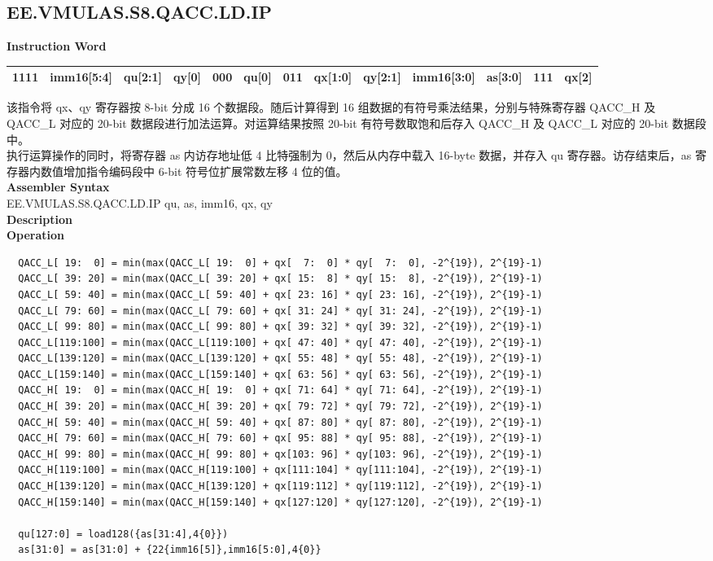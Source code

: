 \subsection{EE.VMULAS.S8.QACC.LD.IP}\label{instruction:EEVMULASS8QACCLDIP}
\setlength\tabcolsep{6pt}
\textbf{Instruction Word} \\
\begin{tabular}{|c|c|c|c|c|c|c|c|c|c|c|c|c|}
	\hline
	1111 & imm16[5:4] & qu[2:1] & qy[0] & 000 & qu[0] & 011 & qx[1:0] & qy[2:1] & imm16[3:0] & as[3:0] & 111 & qx[2] \\
	\hline
\end{tabular}
该指令将 qx、qy 寄存器按 8-bit 分成 16 个数据段。随后计算得到 16 组数据的有符号乘法结果，分别与特殊寄存器 QACC\_H 及 QACC\_L 对应的 20-bit 数据段进行加法运算。对运算结果按照 20-bit 有符号数取饱和后存入 QACC\_H 及 QACC\_L 对应的 20-bit 数据段中。\\
执行运算操作的同时，将寄存器 as 内访存地址低 4 比特强制为 0，然后从内存中载入 16-byte 数据，并存入 qu 寄存器。访存结束后，as 寄存器内数值增加指令编码段中 6-bit 符号位扩展常数左移 4 位的值。\\
\textbf{Assembler Syntax} \\
EE.VMULAS.S8.QACC.LD.IP qu, as, imm16, qx, qy \\
\textbf{Description} \\
\textbf{Operation}
\begin{lstlisting}
  QACC_L[ 19:  0] = min(max(QACC_L[ 19:  0] + qx[  7:  0] * qy[  7:  0], -2^{19}), 2^{19}-1)
  QACC_L[ 39: 20] = min(max(QACC_L[ 39: 20] + qx[ 15:  8] * qy[ 15:  8], -2^{19}), 2^{19}-1)
  QACC_L[ 59: 40] = min(max(QACC_L[ 59: 40] + qx[ 23: 16] * qy[ 23: 16], -2^{19}), 2^{19}-1)
  QACC_L[ 79: 60] = min(max(QACC_L[ 79: 60] + qx[ 31: 24] * qy[ 31: 24], -2^{19}), 2^{19}-1)
  QACC_L[ 99: 80] = min(max(QACC_L[ 99: 80] + qx[ 39: 32] * qy[ 39: 32], -2^{19}), 2^{19}-1)
  QACC_L[119:100] = min(max(QACC_L[119:100] + qx[ 47: 40] * qy[ 47: 40], -2^{19}), 2^{19}-1)
  QACC_L[139:120] = min(max(QACC_L[139:120] + qx[ 55: 48] * qy[ 55: 48], -2^{19}), 2^{19}-1)
  QACC_L[159:140] = min(max(QACC_L[159:140] + qx[ 63: 56] * qy[ 63: 56], -2^{19}), 2^{19}-1)
  QACC_H[ 19:  0] = min(max(QACC_H[ 19:  0] + qx[ 71: 64] * qy[ 71: 64], -2^{19}), 2^{19}-1)
  QACC_H[ 39: 20] = min(max(QACC_H[ 39: 20] + qx[ 79: 72] * qy[ 79: 72], -2^{19}), 2^{19}-1)
  QACC_H[ 59: 40] = min(max(QACC_H[ 59: 40] + qx[ 87: 80] * qy[ 87: 80], -2^{19}), 2^{19}-1)
  QACC_H[ 79: 60] = min(max(QACC_H[ 79: 60] + qx[ 95: 88] * qy[ 95: 88], -2^{19}), 2^{19}-1)
  QACC_H[ 99: 80] = min(max(QACC_H[ 99: 80] + qx[103: 96] * qy[103: 96], -2^{19}), 2^{19}-1)
  QACC_H[119:100] = min(max(QACC_H[119:100] + qx[111:104] * qy[111:104], -2^{19}), 2^{19}-1)
  QACC_H[139:120] = min(max(QACC_H[139:120] + qx[119:112] * qy[119:112], -2^{19}), 2^{19}-1)
  QACC_H[159:140] = min(max(QACC_H[159:140] + qx[127:120] * qy[127:120], -2^{19}), 2^{19}-1)

  qu[127:0] = load128({as[31:4],4{0}})
  as[31:0] = as[31:0] + {22{imm16[5]},imm16[5:0],4{0}}
\end{lstlisting}

